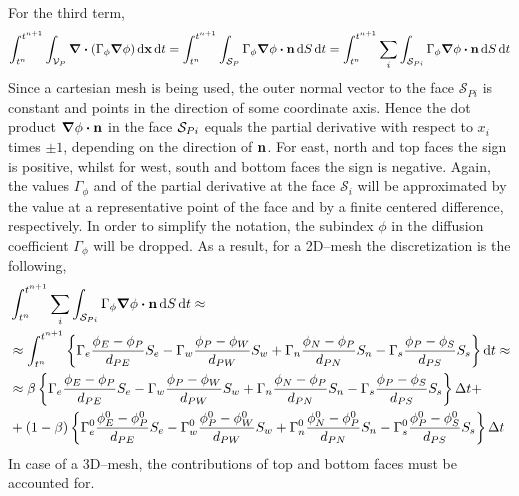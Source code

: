 For the third term,
\begin{equation}
	\int_{t^n}^{t^{n+1}} \int_{\cv{P}} \div(\Gamma_\phi \grad{\phi}) \dd{\vb{x}} \dd{t} = 
	\int_{t^n}^{t^{n+1}} \int_{\cs{P}} \Gamma_\phi \grad{\phi} \vdot \vb{n} \dd{S} \dd{t} = 
	\int_{t^n}^{t^{n+1}} \sum_i \int_{\cs{Pi}} \Gamma_\phi \grad{\phi} \vdot \vb{n} \dd{S} \dd{t}
\end{equation}
Since a cartesian mesh is being used, the outer normal vector to the face $\mathcal{S}_{Pi}$ is constant and points in the direction of some coordinate axis. Hence the dot product $\grad{\phi} \vdot \vb{n}$ in the face $\mathcal{S}_{Pi}$ equals the partial derivative with respect to $x_i$ times $\pm 1$, depending on the direction of $\vb{n}$. For east, north and top faces the sign is positive, whilst for west, south and bottom faces the sign is negative. Again, the values $\Gamma_\phi$ and of the partial derivative at the face $\mathcal{S}_i$ will be approximated by the value at a representative point of the face and by a finite centered difference, respectively. In order to simplify the notation, the subindex $\phi$ in the diffusion coefficient $\Gamma_\phi$ will be dropped. As a result, for a 2D--mesh the discretization is the following,
\begin{align}
	&\int_{t^n}^{t^{n+1}} \sum_i \int_{\cs{Pi}} \Gamma_\phi \grad{\phi} \vdot \vb{n} \dd{S} \dd{t} 
	\approx \nonumber \\ 
	&\approx 
	\int_{t^n}^{t^{n+1}}
	\left\{ 
	\Gamma_e \frac{\phi_E - \phi_P}{d_{PE}} S_e - \Gamma_w \frac{\phi_P - \phi_W}{d_{PW}} S_w +
	\Gamma_n \frac{\phi_N - \phi_P}{d_{PN}} S_n - \Gamma_s \frac{\phi_P - \phi_S}{d_{PS}} S_s 
	\right\} \dd{t} \approx \nonumber \\
	&\approx
	\beta 
	\left\{ 
		\Gamma_e \frac{\phi_E - \phi_P}{d_{PE}} S_e - \Gamma_w \frac{\phi_P - \phi_W}{d_{PW}} S_w +
		\Gamma_n \frac{\phi_N - \phi_P}{d_{PN}} S_n - \Gamma_s \frac{\phi_P - \phi_S}{d_{PS}} S_s 
	\right\} \Delta t + \nonumber \\
	&+ (1 - \beta)
	\left\{ 
	\Gamma_e^0 \frac{\phi_E^0 - \phi_P^0}{d_{PE}} S_e - \Gamma_w^0 \frac{\phi_P^0 - \phi_W^0}{d_{PW}} S_w +
	\Gamma_n^0 \frac{\phi_N^0 - \phi_P^0}{d_{PN}} S_n - \Gamma_s^0 \frac{\phi_P^0 - \phi_S^0}{d_{PS}} S_s 
	\right\} \Delta t
\end{align}
In case of a 3D--mesh, the contributions of top and bottom faces must be accounted for.

